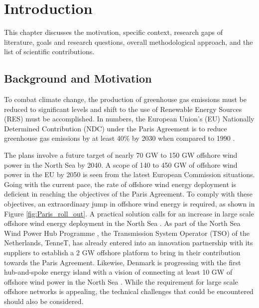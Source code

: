 \chapter{Introduction}\label{1}

This chapter discusses the motivation, specific context, research gaps of literature, goals and research questions, overall methodological approach, and the list of scientific contributions.

\section{Background and Motivation}\label{Background}

To combat climate change, the production of greenhouse gas emissions must be reduced to significant levels and shift to the use of Renewable Energy Sources (\gls{RES}) must be accomplished. In numbers, the European Union's (\gls{EU}) Nationally Determined Contribution (NDC) under the Paris Agreement is to reduce greenhouse gas emissions by at least 40\% by 2030 when compared to 1990 \cite{agreement2015unfccc}. 

The plans involve a future target of nearly 70 GW to 150 GW offshore wind power in the North Sea by 2040. A scope of 140 to 450 GW of offshore wind power in the \gls{EU} by 2050 is seen from the latest European Commission situations. Going with the current pace, the rate of offshore wind energy deployment is deficient in reaching the objectives of the Paris Agreement. To comply with these objectives, an extraordinary jump in offshore wind energy is required, as shown in Figure \ref{fig:Paris_roll_out}. A practical solution calls for an increase in large scale offshore wind energy deployment in the North Sea \cite{noauthor_vision_2020}. As part of the North Sea Wind Power Hub Programme \cite{noauthor_tennet_2020}, the Transmission System Operator (TSO) of the Netherlands, TenneT, has already entered into an innovation partnership with its suppliers to establish a 2 GW offshore platform to bring in their contribution towards the Paris Agreement. Likewise, Denmark is progressing with the first hub-and-spoke energy island with a vision of connecting at least 10 GW of offshore wind power in the North Sea \cite{noauthor_first_2020}. While the requirement for large scale offshore networks is appealing, the technical challenges that could be encountered should also be considered.  

